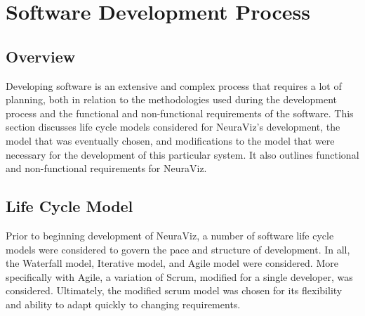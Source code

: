 \section{Software Development Process}
\label{sec:SoftwareDevelopmentProcess}

\subsection{Overview} 
Developing software is an extensive and complex process that requires a lot of planning, both in relation to the methodologies used during the development process and the functional and non-functional requirements of the software. This section discusses life cycle models considered for NeuraViz's development, the model that was eventually chosen, and modifications to the model that were necessary for the development of this particular system. It also outlines functional and non-functional requirements for NeuraViz.

\subsection{Life Cycle Model}
Prior to beginning development of NeuraViz, a number of software life cycle models were considered to govern the pace and structure of development. In all, the Waterfall model, Iterative model, and Agile model were considered. More specifically with Agile, a variation of Scrum, modified for a single developer, was considered. Ultimately, the modified scrum model was chosen for its flexibility and ability to adapt quickly to changing requirements.


